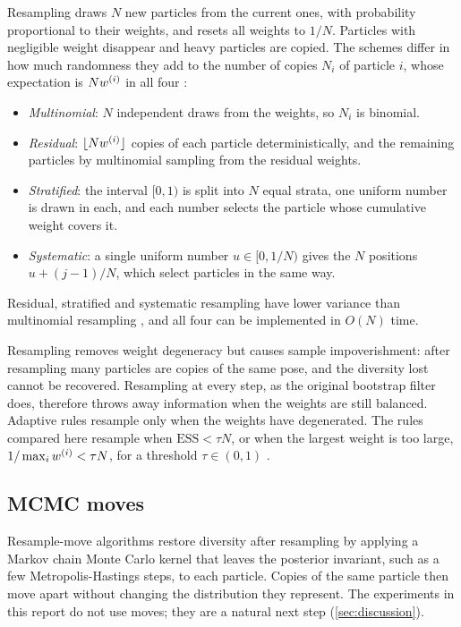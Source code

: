 Resampling draws $N$ new particles from the current ones, with probability proportional to their weights, and resets
all weights to $1/N$. Particles with negligible weight disappear and heavy particles are copied. The schemes differ
in how much randomness they add to the number of copies $N_i$ of particle $i$, whose expectation is $N w^{(i)}$ in
all four \cite{douc2005comparison,hol2006resampling}:
\begin{itemize}
  \item \emph{Multinomial}: $N$ independent draws from the weights, so $N_i$ is binomial.
  \item \emph{Residual}: $\lfloor N w^{(i)} \rfloor$ copies of each particle deterministically, and the remaining
        particles by multinomial sampling from the residual weights.
  \item \emph{Stratified}: the interval $[0, 1)$ is split into $N$ equal strata, one uniform number is drawn in each,
        and each number selects the particle whose cumulative weight covers it.
  \item \emph{Systematic}: a single uniform number $u \in [0, 1/N)$ gives the $N$ positions $u + (j-1)/N$, which
        select particles in the same way.
\end{itemize}
Residual, stratified and systematic resampling have lower variance than multinomial resampling
\cite{douc2005comparison}, and all four can be implemented in $O(N)$ time.

Resampling removes weight degeneracy but causes sample impoverishment: after resampling many particles are copies of
the same pose, and the diversity lost cannot be recovered. Resampling at every step, as the original bootstrap filter
does, therefore throws away information when the weights are still balanced. Adaptive rules resample only when the
weights have degenerated. The rules compared here resample when $\mathrm{ESS} < \tau N$, or when the largest weight is
too large, $1 / \max_i w^{(i)} < \tau N$, for a threshold $\tau \in (0, 1)$ \cite{elfring2021particle}.

\subsection{MCMC moves}

Resample-move algorithms \cite{gilks2001following} restore diversity after resampling by applying a Markov chain Monte
Carlo kernel that leaves the posterior invariant, such as a few Metropolis-Hastings steps, to each particle. Copies
of the same particle then move apart without changing the distribution they represent. The experiments in this
report do not use moves; they are a natural next step (\cref{sec:discussion}).
